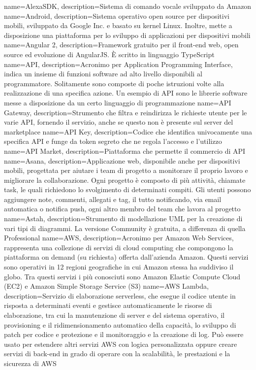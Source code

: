 \hypertarget{A}{}

{
	name=AlexaSDK,
	description={Sistema di comando vocale sviluppato da Amazon}
}
{
	name=Android,
	description={Sistema operativo open source per dispositivi mobili, sviluppato da Google Inc. e basato su kernel Linux. Inoltre, mette a disposizione una piattaforma per lo sviluppo di applicazioni per dispositivi mobili}
}
{
	name=Angular 2,
	description={Framework gratuito per il front-end web, open source ed evoluzione di AngularJS. \MakeUppercase{è} scritto in linguaggio TypeScript}
}
{
	name=API,
	description={Acronimo per Application Programming Interface, indica un insieme di funzioni software ad alto livello disponibili al programmatore. Solitamente sono composte di poche istruzioni volte alla realizzazione di una specifica azione. Un esempio di API sono le librerie software messe a disposizione da un certo linguaggio di programmazione}
}
{
	name=API Gateway,
	description={Strumento che filtra e reindirizza le richieste utente per le varie API, fornendo il servizio, anche se questo non è presente sul server del marketplace}
}
{
	name=API Key,
	description={Codice che identifica univocamente una specifica API e funge da token segreto che ne regola l'accesso e l'utilizzo}
}
{
	name=API Market,
	description={Piattaforma che permette il commercio di API}
}
{
	name=Asana,
	description={Applicazione web, disponibile anche per dispositivi mobili, progettata per aiutare i team di progetto a monitorare il proprio lavoro e migliorare la collaborazione. Ogni progetto è composto di più attività, chiamate task, le quali richiedono lo svolgimento di determinati compiti. Gli utenti possono aggiungere note, commenti, allegati e tag, il tutto notificando, via email automatica o notifica push, ogni altro membro del team che lavora al progetto}
}
{
	name=Astah,
	description={Strumento di modellazione UML per la creazione di vari tipi di diagrammi. La versione Community è gratuita, a differenza di quella Professional}
}
{
	name=AWS,
	description={Acronimo per Amazon Web Services, rappresenta una collezione di servizi di cloud computing che compongono la piattaforma on demand (su richiesta) offerta dall'azienda Amazon. Questi servizi sono operativi in 12 regioni geografiche in cui Amazon stessa ha suddiviso il globo. Tra questi servizi i più conosciuti sono Amazon Elastic Compute Cloud (EC2) e Amazon Simple Storage Service (S3)}
}
{
	name=AWS Lambda,
	description={Servizio di elaborazione serverless, che esegue il codice utente in risposta a determinati eventi e gestisce automaticamente le risorse di elaborazione, tra cui la manutenzione di server e del sistema operativo, il provisioning e il ridimensionamento automatico della capacità, lo sviluppo di patch per codice e protezione e il monitoraggio e la creazione di log. Può essere usato per estendere altri servizi AWS con logica personalizzata oppure creare servizi di back-end in grado di operare con la scalabilità, le prestazioni e la sicurezza di AWS}
}

